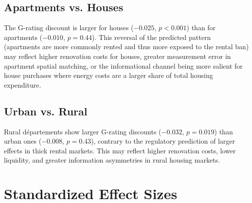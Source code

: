 \documentclass[12pt]{article}
\begin{document}
\subsection{Apartments vs. Houses}

The G-rating discount is larger for houses ($-0.025$, $p < 0.001$) than for apartments ($-0.010$, $p = 0.44$). This reversal of the predicted pattern (apartments are more commonly rented and thus more exposed to the rental ban) may reflect higher renovation costs for houses, greater measurement error in apartment spatial matching, or the informational channel being more salient for house purchases where energy costs are a larger share of total housing expenditure.

\subsection{Urban vs. Rural}

Rural d\'epartements show larger G-rating discounts ($-0.032$, $p = 0.019$) than urban ones ($-0.008$, $p = 0.43$), contrary to the regulatory prediction of larger effects in thick rental markets. This may reflect higher renovation costs, lower liquidity, and greater information asymmetries in rural housing markets.


\section{Standardized Effect Sizes}
\label{sec:sde}
\end{document}
